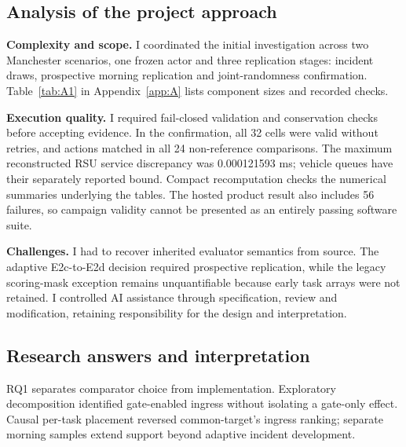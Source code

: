 \documentclass[12pt,a4paper]{article}
\begin{document}
\subsection{Analysis of the project approach}\label{sec:4.2}

\textbf{Complexity and scope.} I coordinated the initial investigation across two Manchester scenarios, one frozen actor and three replication stages: incident draws, prospective morning replication and joint-randomness confirmation. Table~\ref{tab:A1} in Appendix~\ref{app:A} lists component sizes and recorded checks.

\textbf{Execution quality.} I required fail-closed validation and conservation checks before accepting evidence. In the confirmation, all 32 cells were valid without retries, and actions matched in all 24 non-reference comparisons. The maximum reconstructed RSU service discrepancy was 0.000121593 ms; vehicle queues have their separately reported bound. Compact recomputation checks the numerical summaries underlying the tables. The hosted product result also includes 56 failures, so campaign validity cannot be presented as an entirely passing software suite.

\textbf{Challenges.} I had to recover inherited evaluator semantics from source. The adaptive E2c-to-E2d decision required prospective replication, while the legacy scoring-mask exception remains unquantifiable because early task arrays were not retained. I controlled AI assistance through specification, review and modification, retaining responsibility for the design and interpretation.

\FloatBarrier
\subsection{Research answers and interpretation}\label{sec:4.3}

RQ1 separates comparator choice from implementation. Exploratory decomposition identified gate-enabled ingress without isolating a gate-only effect. Causal per-task placement reversed common-target's ingress ranking; separate morning samples extend support beyond adaptive incident development.
\end{document}

